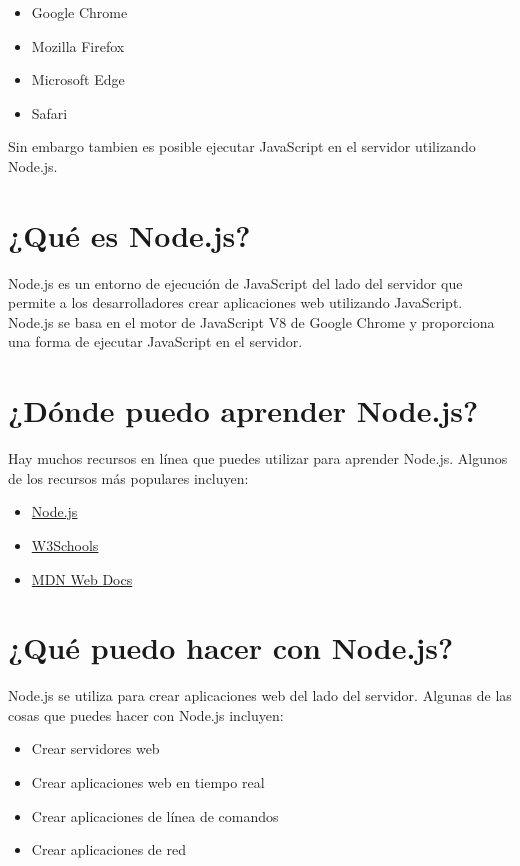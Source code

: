 \documentclass[
  a4paper,
  DIV=11,
  numbers=noendperiod,
  onepage,
  openany]{scrreprt}
\providecommand{\tightlist}{%
  \setlength{\itemsep}{0pt}\setlength{\parskip}{0pt}}\usepackage{longtable,booktabs,array}
\begin{document}
\begin{itemize}
\tightlist
\item
  Google Chrome
\item
  Mozilla Firefox
\item
  Microsoft Edge
\item
  Safari
\end{itemize}

Sin embargo tambien es posible ejecutar JavaScript en el servidor
utilizando Node.js.

\section{¿Qué es Node.js?}\label{quuxe9-es-node.js}

Node.js es un entorno de ejecución de JavaScript del lado del servidor
que permite a los desarrolladores crear aplicaciones web utilizando
JavaScript. Node.js se basa en el motor de JavaScript V8 de Google
Chrome y proporciona una forma de ejecutar JavaScript en el servidor.

\section{¿Dónde puedo aprender
Node.js?}\label{duxf3nde-puedo-aprender-node.js}

Hay muchos recursos en línea que puedes utilizar para aprender Node.js.
Algunos de los recursos más populares incluyen:

\begin{itemize}
\tightlist
\item
  \href{https://nodejs.org/en/docs/}{Node.js}
\item
  \href{https://www.w3schools.com/nodejs/default.asp}{W3Schools}
\item
  \href{https://developer.mozilla.org/en-US/docs/Learn/Server-side/Nodejs}{MDN
  Web Docs}
\end{itemize}

\section{¿Qué puedo hacer con
Node.js?}\label{quuxe9-puedo-hacer-con-node.js}

Node.js se utiliza para crear aplicaciones web del lado del servidor.
Algunas de las cosas que puedes hacer con Node.js incluyen:

\begin{itemize}
\tightlist
\item
  Crear servidores web
\item
  Crear aplicaciones web en tiempo real
\item
  Crear aplicaciones de línea de comandos
\item
  Crear aplicaciones de red
\end{itemize}
\end{document}
